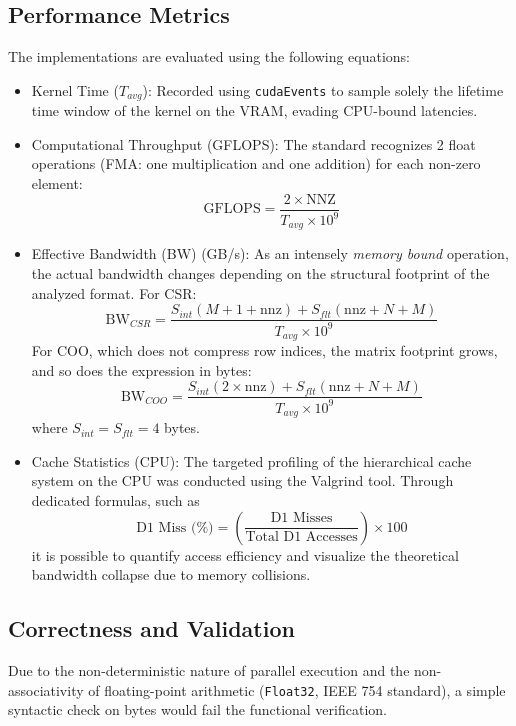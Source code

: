 \documentclass[conference]{IEEEtran}
\begin{document}
\subsection{Performance Metrics}
The implementations are evaluated using the following equations:
\begin{itemize}
    \item Kernel Time ($T_{avg}$): Recorded using \texttt{cudaEvents} to sample solely the lifetime time window of the kernel on the VRAM, evading CPU-bound latencies.
    
    \item Computational Throughput (GFLOPS): The standard recognizes 2 float operations (FMA: one multiplication and one addition) for each non-zero element:
    \begin{equation}
        \text{GFLOPS} = \frac{2 \times \text{NNZ}}{T_{avg} \times 10^9}
    \end{equation}

    \item Effective Bandwidth (BW) (GB/s): As an intensely \textit{memory bound} operation, the actual bandwidth changes depending on the structural footprint of the analyzed format.
    For CSR:
    \begin{equation}
        \text{BW}_{CSR} = \frac{S_{int} (M + 1 + \text{nnz}) + S_{flt} (\text{nnz} + N + M)}{T_{avg} \times 10^9}
    \end{equation}
    For COO, which does not compress row indices, the matrix footprint grows, and so does the expression in bytes:
    \begin{equation}
        \text{BW}_{COO} = \frac{S_{int} (2 \times \text{nnz}) + S_{flt} (\text{nnz} + N + M)}{T_{avg} \times 10^9}
    \end{equation}
    where $S_{int} = S_{flt} = 4$ bytes. 
    
\item Cache Statistics (CPU): The targeted profiling of the hierarchical cache system on the CPU was conducted using the Valgrind tool. Through dedicated formulas, such as 
\begin{equation}
\text{D1 Miss (\%)} = \left( \frac{\text{D1 Misses}}{\text{Total D1 Accesses}} \right) \times 100
\end{equation}  it is possible to quantify access efficiency and visualize the theoretical bandwidth collapse due to memory collisions.
\end{itemize}
\subsection{Correctness and Validation}
Due to the non-deterministic nature of parallel execution and the non-associativity of floating-point arithmetic (\texttt{Float32}, IEEE 754 standard), a simple syntactic check on bytes would fail the functional verification.
\end{document}
